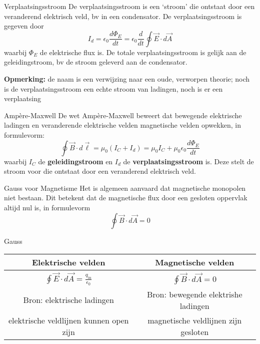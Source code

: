 \begin{theo}[Verplaatsingsstroom]{Verplaatsingsstroom}
    De verplaatsingsstroom is een `stroom' die ontstaat door een veranderend elektrisch veld, bv in een condensator. De verplaatsingsstroom is gegeven door
    \begin{equation*}
        I_d = \epsilon_0 \frac{d\Phi_E}{dt} = \epsilon_0 \frac{d}{dt} \oint \Vec{E} \cdot d\Vec{A}
    \end{equation*}
    waarbij $ \Phi_E $ de elektrische flux is.
    De totale verplaatsingsstroom is gelijk aan de geleidingstroom, bv de stroom geleverd aan de condensator.

    \vspace{0.3cm}
    \noindent \textbf{Opmerking:} de naam is een verwijzing naar een oude, verworpen theorie; noch is de verplaatsingsstroom een echte stroom van ladingen, noch is er een verplaatsing
\end{theo}

\begin{lem}{Ampère-Maxwell}
    De wet Ampère-Maxwell beweert dat bewegende elektrische ladingen en veranderende elektrische velden magnetische velden opwekken, in formulevorm:
    \begin{equation*}
        \oint \Vec{B} \cdot d\Vec{\ell}
        = \mu_0 ( I_C + I_d ) 
        = \mu_0 I_C + \mu_0 \epsilon_0 \frac{d\Phi_E}{dt} 
    \end{equation*}
    waarbij $ I_C $ de \textbf{geleidingstroom} en $ I_d $ de \textbf{verplaatsingsstroom} is. Deze stelt de stroom voor die ontstaat door een veranderend elektrisch veld. 
\end{lem}

\begin{lem}{Gauss voor Magnetisme}
    Het is algemeen aanvaard dat magnetische monopolen niet bestaan. Dit betekent dat de magnetische flux door een gesloten oppervlak altijd nul is, in formulevorm
    \begin{equation*}
        \oint \Vec{B} \cdot d\Vec{A} = 0
    \end{equation*}
    \vspace{-0.5cm}
\end{lem}

\begin{vrg}[Gauss]{Gauss}
    \vspace{-0.3cm}
    \def\arraystretch{2}
    \hspace{1.5cm}
    \begin{tabular}{c|c}
        Elektrische velden & Magnetische velden \\ \hline
        $\oint \Vec{E} \cdot d\Vec{A} = \frac{q_{\text{in}}}{\epsilon_0}$ &  $\oint \Vec{B} \cdot d\Vec{A} = 0$ \\
        Bron: elektrische ladingen & Bron: bewegende elektrishe ladingen \\
        elektrische veldlijnen kunnen open zijn & magnetische veldlijnen zijn gesloten \\
    \end{tabular}
\end{vrg}